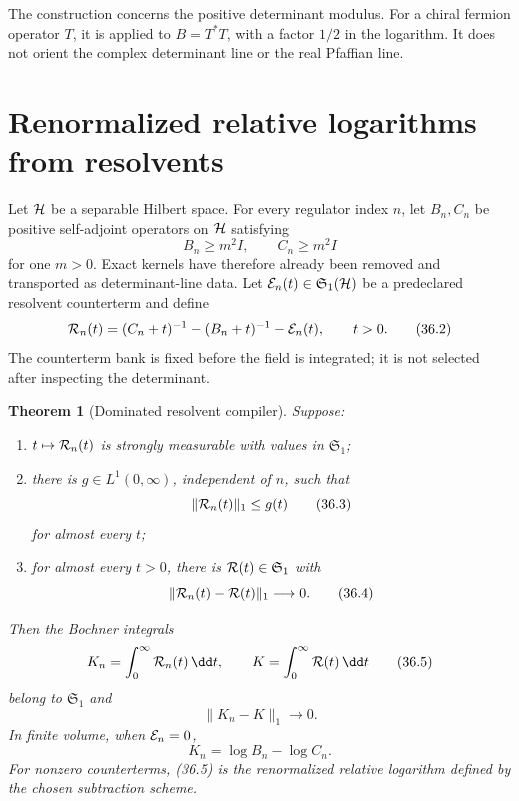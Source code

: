 \documentclass[11pt]{article}
\newtheorem{theorem}{Theorem}[section]
\theoremstyle{remark}
\begin{document}
The construction concerns the positive determinant modulus.  For a
chiral fermion operator \(T\), it is applied to \(B=T^*T\), with a
factor \(1/2\) in the logarithm.  It does not orient the complex
determinant line or the real Pfaffian line.

\section{Renormalized relative logarithms from resolvents}

Let \({\cal H}\) be a separable Hilbert space.  For every regulator
index \(n\), let \(B_n,C_n\) be positive self-adjoint operators on
\({\cal H}\) satisfying
\[
 B_n\geq m^2I,\qquad C_n\geq m^2I                       \tag{36.1}
\]
for one \(m>0\).  Exact kernels have therefore already been removed
and transported as determinant-line data.  Let
\({\cal E}_n(t)\in{\mathfrak S}_1({\cal H})\) be a predeclared
resolvent counterterm and define
\[
 {\cal R}_n(t)=
 (C_n+t)^{-1}-(B_n+t)^{-1}-{\cal E}_n(t),
 \qquad t>0.                                             \tag{36.2}
\]
The counterterm bank is fixed before the field is integrated; it is
not selected after inspecting the determinant.

\begin{theorem}[Dominated resolvent compiler]
\label{thm:v15v36-resolvent-compiler}
Suppose:
\begin{enumerate}
\item \(t\mapsto{\cal R}_n(t)\) is strongly measurable with values
      in \({\mathfrak S}_1\);
\item there is \(g\in L^1(0,\infty)\), independent of \(n\), such
      that
      \[
       \|{\cal R}_n(t)\|_1\leq g(t)                       \tag{36.3}
      \]
      for almost every \(t\);
\item for almost every \(t>0\), there is
      \({\cal R}(t)\in{\mathfrak S}_1\) with
      \[
       \|{\cal R}_n(t)-{\cal R}(t)\|_1\longrightarrow0.   \tag{36.4}
      \]
\end{enumerate}
Then the Bochner integrals
\[
 K_n=\int_0^\infty{\cal R}_n(t)\,\dd t,\qquad
 K=\int_0^\infty{\cal R}(t)\,\dd t                       \tag{36.5}
\]
belong to \({\mathfrak S}_1\) and
\[
 \boxed{\|K_n-K\|_1\longrightarrow0.}                    \tag{36.6}
\]
In finite volume, when \({\cal E}_n=0\),
\[
 K_n=\log B_n-\log C_n.                                  \tag{36.7}
\]
For nonzero counterterms, (36.5) is the renormalized relative
logarithm defined by the chosen subtraction scheme.
\end{theorem}
\end{document}
